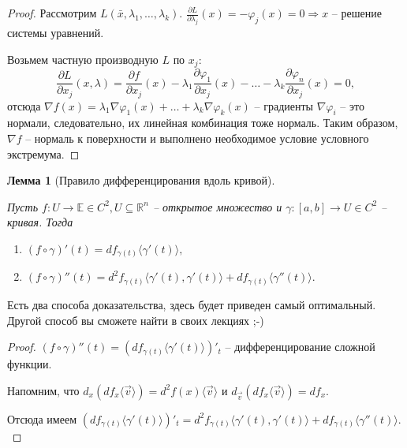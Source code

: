 \documentclass[a5paper]{article}
\newcounter{through}
\theoremstyle{plain}
\newtheorem{lemma}[through]{Лемма}
\theoremstyle{definition}
\numberwithin{through}{section}
\numberwithin{equation}{section}
\begin{document}
\begin{proof}
	Рассмотрим $L(\bar{x}, \lambda_1,\ldots,\lambda_k)$. $\frac{\partial L}{\partial \lambda_j}(x) = - \varphi_j(x) = 0 \Rightarrow x$ -- решение системы уравнений. 
	
	Возьмем частную производную $L$ по $x_j$:
	\[ \frac{\partial L}{\partial x_j} (x, \lambda) = \frac{\partial f}{\partial x_j}(x) - 
	\lambda_1\frac{\partial \varphi_1}{\partial x_j}(x) - 
	\ldots - \lambda_k \frac{\partial \varphi_n}{\partial x_j}(x) = 0, \]
	отсюда $\nabla f(x) = \lambda_1\nabla\varphi_1(x) + \ldots +
	\lambda_k\nabla\varphi_k(x) $ -- градиенты $\nabla\varphi_i$ -- это нормали, следовательно, их линейная комбинация тоже нормаль. Таким образом, $\nabla f$ -- нормаль к поверхности и выполнено необходимое условие условного экстремума.
	\end{proof}



\begin{lemma}[Правило дифференцирования вдоль кривой] 
	\label{CurveDiffRule}
	\
	
	Пусть $f: U \to \mathbb{E} \in C^2, U \subseteq \mathbb{R}^n$ -- открытое множество 
	и $\gamma:[a, b] \to U \in C^2$ -- кривая. Тогда
	\begin{enumerate}
		\item 
		$(f\circ\gamma)'(t) = df_{\gamma(t)} \langle \gamma'(t)\rangle,$
		\item 
		$(f\circ\gamma)''(t) = d^2f_{\gamma(t)} \langle \gamma'(t), 
		\gamma'(t)\rangle + df_{\gamma(t)} \langle \gamma''(t) \rangle.$
	\end{enumerate}
\end{lemma}

	Есть два способа доказательства, здесь будет приведен самый оптимальный. Другой способ вы сможете найти в своих лекциях ;-)
\begin{proof}
	$(f \circ \gamma)''(t) = \left(df_{\gamma(t)}\langle \gamma'(t) \rangle\right)'_t $ -- дифференцирование сложной функции.
	
	Напомним, что $d_x\left(df_x\langle \vec{v}\rangle\right) = d^2f(x)\langle \vec{v} \rangle$ и
	$d_{\vec{v}} \left(df_x \langle \vec{v} \rangle\right) = df_x.$
	
	Отсюда имеем $\left( df_{\gamma(t)}\langle \gamma'(t)\rangle \right)'_t = 
	d^2f_{\gamma(t)} \langle \gamma'(t), \gamma'(t) \rangle + df_{\gamma(t)} \langle \gamma''(t) \rangle.$
	
\end{proof}
\end{document}
